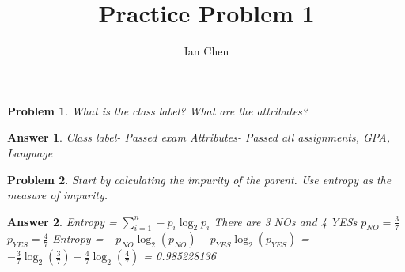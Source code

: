 \documentclass[11pt]{article}
\author{Ian Chen}
\title{Practice Problem 1}
\theoremstyle{description}
\newtheorem{problem}{Problem}
\theoremstyle{break}
\newtheorem*{answer}{Answer}
\begin{document}
    \maketitle

    \setcounter{problem}{-1}
    \begin{problem}
        What is the class label?
        What are the attributes?
    \end{problem}
    \begin{answer}
        Class label- Passed exam\newline
        Attributes- Passed all assignments, GPA, Language
    \end{answer}

    \begin{problem}
        Start by calculating the impurity of the parent.
        Use entropy as the measure of impurity.
    \end{problem}
    \begin{answer}
        Entropy = $\sum_{i=1}^{n} -p_i \log_2 p_i$\newline
        There are 3 NOs and 4 YESs\newline
        $p_{NO} = \frac{3}{7}$\newline
        $p_{YES} = \frac{4}{7}$\newline
        Entropy = $-p_{NO} \log_{2}( p_{NO}) - p_{YES} \log_{2}(p_{YES})$\newline
        = $-\frac{3}{7} \log_{2}(\frac{3}{7}) - \frac{4}{7} \log_{2}(\frac{4}{7})$\newline
        = 0.985228136\newline
    \end{answer}
\end{document}
